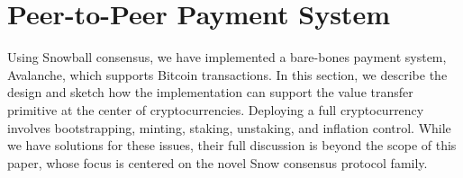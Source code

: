 \documentclass[letterpaper,twocolumn,10pt]{article}
\newcommand{\tronly}[2]{#1}
\theoremstyle{definition}
\begin{document}



\section{Peer-to-Peer Payment System}
\label{sec:implementation}


Using Snowball consensus, we have implemented a bare-bones payment system, Avalanche, which supports Bitcoin transactions. In this section, we describe the design and sketch how the implementation can support the value transfer primitive at the center of cryptocurrencies.
Deploying a full cryptocurrency involves bootstrapping, minting, staking, unstaking,
and inflation control. While we have solutions for these issues, their full
discussion is beyond the scope of this paper, whose focus is centered on the
novel Snow consensus protocol family.
\end{document}
